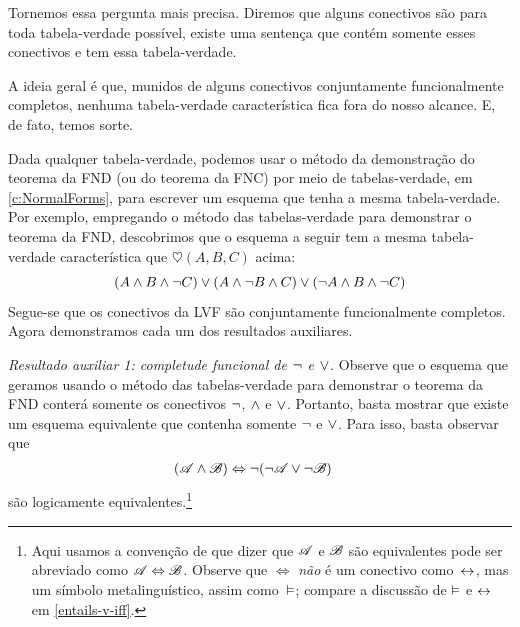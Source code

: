 Tornemos essa pergunta mais precisa. Diremos que alguns conectivos são  \emph{\ifeff} para toda tabela-verdade possível, existe uma sentença que contém somente esses conectivos e tem essa tabela-verdade.


A ideia geral é que, munidos de alguns conectivos conjuntamente funcionalmente completos, nenhuma tabela-verdade característica fica fora do nosso alcance. E, de fato, temos sorte.

Dada qualquer tabela-verdade, podemos usar o método da demonstração do teorema da FND (ou do teorema da FNC) por meio de tabelas-verdade, em \cref{c:NormalForms}, para escrever um esquema que tenha a mesma tabela-verdade. Por exemplo, empregando o método das tabelas-verdade para demonstrar o teorema da FND, descobrimos que o esquema a seguir tem a mesma tabela-verdade característica que $\heartsuit(A,B,C)$ acima:
		$$(A \wedge B \wedge \neg C) \vee (A \wedge \neg B \wedge C) \vee (\neg A \wedge B \wedge \neg C)$$
Segue-se que os conectivos da LVF são conjuntamente funcionalmente completos. Agora demonstramos cada um dos resultados auxiliares.

\emph{Resultado auxiliar 1: completude funcional de $\neg$ e $\vee$.} Observe que o esquema que geramos usando o método das tabelas-verdade para demonstrar o teorema da FND conterá somente os conectivos $\neg$, $\wedge$ e $\vee$. Portanto, basta mostrar que existe um esquema equivalente que contenha somente $\neg$ e $\vee$. Para isso, basta observar que
		\begin{align*}
		(\mathscr{A} \wedge \mathscr{B}) & \Leftrightarrow \neg(\neg \mathscr{A} \vee\neg \mathscr{B})
		\end{align*}
são logicamente equivalentes.\footnote{Aqui usamos a convenção de que dizer que $\mathscr{A}$ e $\mathscr{B}$ são equivalentes pode ser abreviado como $\mathscr{A} \Leftrightarrow \mathscr{B}$. Observe que $\Leftrightarrow$ \emph{não} é um conectivo como~$\leftrightarrow$, mas um símbolo metalinguístico, assim como~$\vDash$; compare a discussão de $\vDash$ e $\leftrightarrow$ em \cref{entails-v-iff}.}






